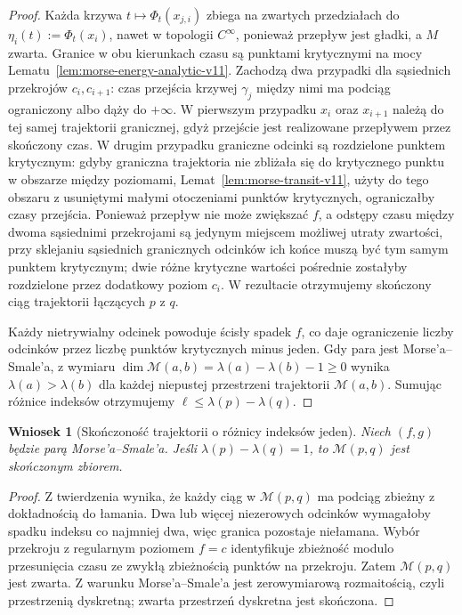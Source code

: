 \documentclass[11pt,a4paper,oneside]{report}
\theoremstyle{plain}
\newtheorem{wniosek}[twierdzenie]{Wniosek}
\theoremstyle{definition}
\theoremstyle{remark}
\begin{document}
\begin{proof}
Każda krzywa $t\mapsto\Phi_t(x_{j,i})$ zbiega na zwartych
przedziałach do $\eta_i(t):=\Phi_t(x_i)$, nawet w topologii
$C^\infty$, ponieważ przepływ jest gładki, a $M$ zwarta.
Granice w obu kierunkach czasu są punktami krytycznymi
na mocy Lematu~\ref{lem:morse-energy-analytic-v11}.
Zachodzą dwa przypadki dla sąsiednich przekrojów $c_i,c_{i+1}$:
czas przejścia krzywej $\gamma_j$ między nimi ma podciąg
ograniczony albo dąży do $+\infty$.
W pierwszym przypadku $x_i$ oraz $x_{i+1}$ należą do tej
samej trajektorii granicznej, gdyż przejście jest realizowane
przepływem przez skończony czas.
W drugim przypadku graniczne odcinki są rozdzielone
punktem krytycznym: gdyby graniczna trajektoria nie
zbliżała się do krytycznego punktu w obszarze między
poziomami, Lemat~\ref{lem:morse-transit-v11}, użyty do
tego obszaru z usuniętymi małymi otoczeniami punktów
krytycznych, ograniczałby czasy przejścia.
Ponieważ przepływ nie może zwiększać $f$, a odstępy czasu
między dwoma sąsiednimi przekrojami są jedynym miejscem
możliwej utraty zwartości, przy sklejaniu
sąsiednich granicznych odcinków ich końce muszą być tym
samym punktem krytycznym; dwie różne krytyczne wartości
pośrednie zostałyby rozdzielone przez dodatkowy poziom
$c_i$. W rezultacie otrzymujemy skończony ciąg trajektorii
łączących $p$ z $q$.

Każdy nietrywialny odcinek powoduje ścisły spadek $f$,
co daje ograniczenie liczby odcinków przez liczbę
punktów krytycznych minus jeden.
Gdy para jest Morse'a--Smale'a, z wymiaru
$\dim\mathcal M(a,b)=\lambda(a)-\lambda(b)-1\ge0$
wynika $\lambda(a)>\lambda(b)$ dla każdej niepustej
przestrzeni trajektorii $\mathcal M(a,b)$.
Sumując różnice indeksów otrzymujemy
$\ell\le\lambda(p)-\lambda(q)$.
\end{proof}

\begin{wniosek}[Skończoność trajektorii o różnicy indeksów jeden]
\label{cor:morse-rigid-finite-v11}
Niech $(f,g)$ będzie parą Morse'a--Smale'a.
Jeśli $\lambda(p)-\lambda(q)=1$, to
$\mathcal M(p,q)$ jest skończonym zbiorem.
\end{wniosek}
\begin{proof}
Z twierdzenia wynika, że każdy ciąg w $\mathcal M(p,q)$
ma podciąg zbieżny z dokładnością do łamania.
Dwa lub więcej niezerowych odcinków wymagałoby spadku indeksu
co najmniej dwa, więc granica pozostaje niełamana.
Wybór przekroju z regularnym poziomem $f=c$ identyfikuje
zbieżność modulo przesunięcia czasu ze zwykłą zbieżnością
punktów na przekroju. Zatem $\mathcal M(p,q)$ jest zwarta.
Z warunku Morse'a--Smale'a jest zerowymiarową rozmaitością,
czyli przestrzenią dyskretną; zwarta przestrzeń dyskretna
jest skończona.
\end{proof}
\end{document}
